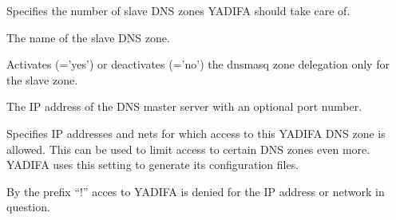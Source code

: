 \begin{description}

    Specifies the number of slave DNS zones YADIFA should take care of.


    The name of the slave DNS zone.


    Activates (='yes') or deactivates (='no') the dnsmasq zone delegation only for the slave zone.


    The IP address of the DNS master server with an optional port number.


    Specifies IP addresses and nets for which access to this YADIFA DNS zone
    is allowed. This can be used to limit access to certain DNS zones even more.
    YADIFA uses this setting to generate its configuration files.

    By the prefix ``!'' acces to YADIFA is denied for the IP address or network in question.

\end{description}
